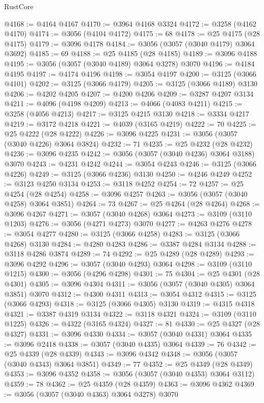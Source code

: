 \begin{lexlean}{RustCore}
\begin{coremodule}
@4168 := @4164 @4167
@4170 := @3964 @4168 @3324
@4172 := @3258 (@4162 @4170)
@4174 := @3056 (@4104 @4172)
@4175 := 68
@4178 := @25 @4175 (@28 @4175)
@4179 := @3096 @4178
@4184 := @3056 (@3057 (@3040 @4179) @3064 @3692)
@4185 := 69
@4188 := @25 @4185 (@28 @4185)
@4189 := @3096 @4188
@4195 := @3056 (@3057 (@3040 @4189) @3064 @3278) @3070
@4196 := @4184 @4195
@4197 := @4174 @4196
@4198 := @3054 @4197
@4200 := @3125 (@3066 @4101)
@4202 := @3125 (@3066 @4179)
@4205 := @3125 (@3066 @4189) @3130
@4206 := @4202 @4205
@4207 := @4200 @4206
@4209 := @3287 @4207 @3134
@4211 := @4096 (@4198 @4209)
@4213 := @4066 (@4083 @4211)
@4215 := @3258 (@4056 @4213)
@4217 := @3125 @4215 @3130
@4218 := @3334 @4217
@4219 := @3172 @4218
@4221 := @4039 (@3165 @4219)
@4222 := 70
@4225 := @25 @4222 (@28 @4222)
@4226 := @3096 @4225
@4231 := @3056 (@3057 (@3040 @4226) @3064 @3824)
@4232 := 71
@4235 := @25 @4232 (@28 @4232)
@4236 := @3096 @4235
@4242 := @3056 (@3057 (@3040 @4236) @3064 @3188) @3070
@4243 := @4231 @4242
@4244 := @3054 @4243
@4246 := @3125 (@3066 @4226)
@4249 := @3125 (@3066 @4236) @3130
@4250 := @4246 @4249
@4252 := @3123 @4250 @3134
@4253 := @3118 @4252
@4254 := 72
@4257 := @25 @4254 (@28 @4254)
@4258 := @3096 @4257
@4263 := @3056 (@3057 (@3040 @4258) @3064 @3851)
@4264 := 73
@4267 := @25 @4264 (@28 @4264)
@4268 := @3096 @4267
@4271 := @3057 (@3040 @4268) @3064
@4273 := @3109 (@3110 @1203)
@4276 := @3056 (@4271 @4273) @3070
@4277 := @4263 @4276
@4278 := @3054 @4277
@4280 := @3125 (@3066 @4258)
@4283 := @3125 (@3066 @4268) @3130
@4284 := @4280 @4283
@4286 := @3387 @4284 @3134
@4288 := @3118 @4286 @3874
@4289 := 74
@4292 := @25 @4289 (@28 @4289)
@4293 := @3096 @4292
@4296 := @3057 (@3040 @4293) @3064
@4298 := @3109 (@3110 @1215)
@4300 := @3056 (@4296 @4298)
@4301 := 75
@4304 := @25 @4301 (@28 @4301)
@4305 := @3096 @4304
@4311 := @3056 (@3057 (@3040 @4305) @3064 @3851) @3070
@4312 := @4300 @4311
@4313 := @3054 @4312
@4315 := @3125 (@3066 @4293)
@4318 := @3125 (@3066 @4305) @3130
@4319 := @4315 @4318
@4321 := @3387 @4319 @3134
@4322 := @3118 @4321
@4324 := @3109 (@3110 @1225)
@4326 := @4322 (@3165 @4324)
@4327 := 81
@4330 := @25 @4327 (@28 @4327)
@4331 := @3096 @4330
@4334 := @3057 (@3040 @4331) @3064
@4335 := @3096 @2418
@4338 := @3057 (@3040 @4335) @3064
@4339 := 76
@4342 := @25 @4339 (@28 @4339)
@4343 := @3096 @4342
@4348 := @3056 (@3057 (@3040 @4343) @3064 @3851)
@4349 := 77
@4352 := @25 @4349 (@28 @4349)
@4353 := @3096 @4352
@4358 := @3056 (@3057 (@3040 @4353) @3064 @3112)
@4359 := 78
@4362 := @25 @4359 (@28 @4359)
@4363 := @3096 @4362
@4369 := @3056 (@3057 (@3040 @4363) @3064 @3278) @3070

\end{coremodule}
\end{lexlean}
